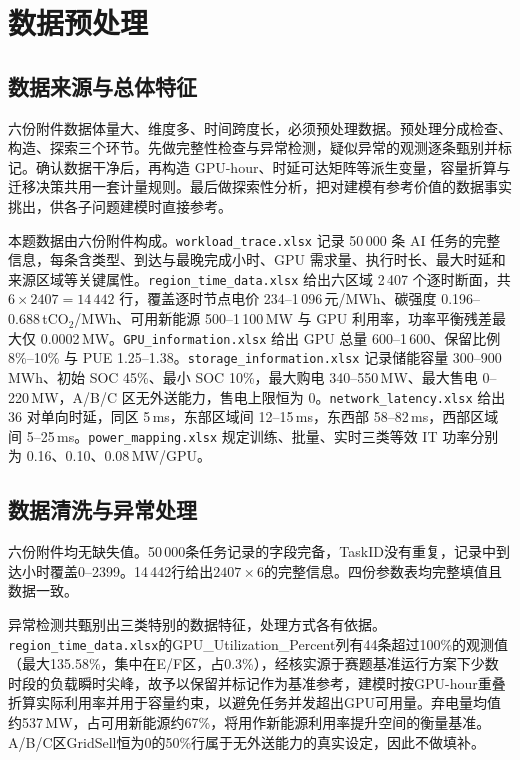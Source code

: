 \section{数据预处理}

\subsection{数据来源与总体特征}

六份附件数据体量大、维度多、时间跨度长，必须预处理数据。预处理分成检查、构造、探索三个环节。先做完整性检查与异常检测，疑似异常的观测逐条甄别并标记。确认数据干净后，再构造 GPU-hour、时延可达矩阵等派生变量，容量折算与迁移决策共用一套计量规则。最后做探索性分析，把对建模有参考价值的数据事实挑出，供各子问题建模时直接参考。

本题数据由六份附件构成。\texttt{workload\_trace.xlsx} 记录 50\,000 条 AI 任务的完整信息，每条含类型、到达与最晚完成小时、GPU 需求量、执行时长、最大时延和来源区域等关键属性。\texttt{region\_time\_data.xlsx} 给出六区域 2\,407 个逐时断面，共 $6\times2407=14\,442$ 行，覆盖逐时节点电价 234--1\,096\,元/MWh、碳强度 0.196--0.688\,tCO$_2$/MWh、可用新能源 500--1\,100\,MW 与 GPU 利用率，功率平衡残差最大仅 0.0002\,MW。\texttt{GPU\_information.xlsx} 给出 GPU 总量 600--1\,600、保留比例 8\%--10\% 与 PUE 1.25--1.38。\texttt{storage\_information.xlsx} 记录储能容量 300--900\,MWh、初始 SOC 45\%、最小 SOC 10\%，最大购电 340--550\,MW、最大售电 0--220\,MW，A/B/C 区无外送能力，售电上限恒为 0。\texttt{network\_latency.xlsx} 给出 36 对单向时延，同区 5\,ms，东部区域间 12--15\,ms，东西部 58--82\,ms，西部区域间 5--25\,ms。\texttt{power\_mapping.xlsx} 规定训练、批量、实时三类等效 IT 功率分别为 0.16、0.10、0.08\,MW/GPU。

\subsection{数据清洗与异常处理}

六份附件均无缺失值。50\,000条任务记录的字段完备，TaskID没有重复，记录中到达小时覆盖0--2399。14\,442行给出$2407\times6$的完整信息。四份参数表均完整填值且数据一致。

异常检测共甄别出三类特别的数据特征，处理方式各有依据。\texttt{region\_time\_data.xlsx}的GPU\_Utilization\_Percent列有44条超过100\%的观测值（最大135.58\%，集中在E/F区，占0.3\%），经核实源于赛题基准运行方案下少数时段的负载瞬时尖峰，故予以保留并标记作为基准参考，建模时按GPU-hour重叠折算实际利用率并用于容量约束，以避免任务并发超出GPU可用量。弃电量均值约537\,MW，占可用新能源约67\%，将用作新能源利用率提升空间的衡量基准。A/B/C区GridSell恒为0的50\%行属于无外送能力的真实设定，因此不做填补。

